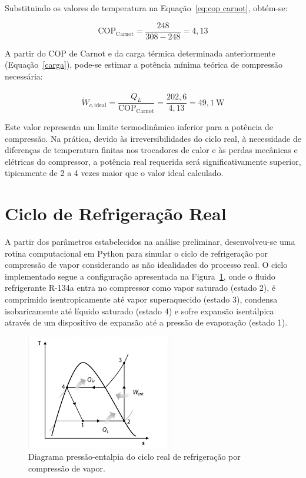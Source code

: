 Substituindo os valores de temperatura na Equação~\ref{eq:cop carnot}, obtém-se:

\begin{equation}
    \text{COP}_{\text{Carnot}} = \frac{248}{308 - 248} = 4,13
\end{equation}

A partir do COP de Carnot e da carga térmica determinada anteriormente (Equação~\ref{carga}), pode-se estimar a potência mínima teórica de compressão necessária:

\begin{equation}
    \dot{W}_{c,\text{ideal}} = \frac{\dot{Q}_L}{\text{COP}_{\text{Carnot}}} = \frac{202,6}{4,13} = 49,1~\text{W}
    \label{eq:potencia ideal}
\end{equation}

Este valor representa um limite termodinâmico inferior para a potência de compressão. Na prática, devido às irreversibilidades do ciclo real, à necessidade de diferenças de temperatura finitas nos trocadores de calor e às perdas mecânicas e elétricas do compressor, a potência real requerida será significativamente superior, tipicamente de 2 a 4 vezes maior que o valor ideal calculado.

\section{Ciclo de Refrigeração Real}

A partir dos parâmetros estabelecidos na análise preliminar, desenvolveu-se uma rotina computacional em Python para simular o ciclo de refrigeração por compressão de vapor considerando as não idealidades do processo real. O ciclo implementado segue a configuração apresentada na Figura~\ref{fig:ciclo padrão}, onde o fluido refrigerante R-134a entra no compressor como vapor saturado (estado 2), é comprimido isentropicamente até vapor superaquecido (estado 3), condensa isobaricamente até líquido saturado (estado 4) e sofre expansão isentálpica através de um dispositivo de expansão até a pressão de evaporação (estado 1).

\begin{figure}[ht]
    \centering
    \includegraphics[width=0.6\linewidth]{Imagens/Desenvolvimento/Diagrama.png}
    \caption{Diagrama pressão-entalpia do ciclo real de refrigeração por compressão de vapor.}
    \label{fig:ciclo padrão}
\end{figure}


